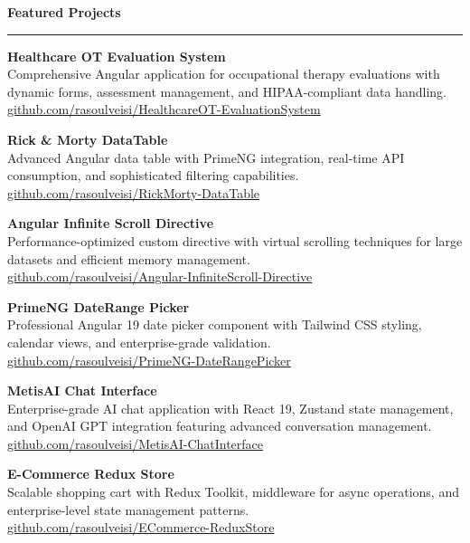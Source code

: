 \documentclass[a4paper,10pt]{article}
\newcommand{\sectionheader}[1]{\vspace{6pt}\textbf{\large\color{headercolor}#1}\vspace{1pt}\hrule\vspace{4pt}}
\newcommand{\projecttitle}[1]{\textbf{#1}}
\begin{document}
\sectionheader{Featured Projects}
\vspace{-2pt}
\begin{multicols}{2}

\projecttitle{Healthcare OT Evaluation System} \\
Comprehensive Angular application for occupational therapy evaluations with dynamic forms, assessment management, and HIPAA-compliant data handling. \\
\href{https://github.com/rasoulveisi/HealthcareOT-EvaluationSystem}{\footnotesize github.com/rasoulveisi/HealthcareOT-EvaluationSystem}

\vspace{4pt}
\projecttitle{Rick \& Morty DataTable} \\
Advanced Angular data table with PrimeNG integration, real-time API consumption, and sophisticated filtering capabilities. \\
\href{https://github.com/rasoulveisi/RickMorty-DataTable}{\footnotesize github.com/rasoulveisi/RickMorty-DataTable}

\vspace{4pt}
\projecttitle{Angular Infinite Scroll Directive} \\
Performance-optimized custom directive with virtual scrolling techniques for large datasets and efficient memory management. \\
\href{https://github.com/rasoulveisi/Angular-InfiniteScroll-Directive}{\footnotesize github.com/rasoulveisi/Angular-InfiniteScroll-Directive}

\columnbreak

\projecttitle{PrimeNG DateRange Picker} \\
Professional Angular 19 date picker component with Tailwind CSS styling, calendar views, and enterprise-grade validation. \\
\href{https://github.com/rasoulveisi/PrimeNG-DateRangePicker}{\footnotesize github.com/rasoulveisi/PrimeNG-DateRangePicker}

\vspace{4pt}
\projecttitle{MetisAI Chat Interface} \\
Enterprise-grade AI chat application with React 19, Zustand state management, and OpenAI GPT integration featuring advanced conversation management. \\
\href{https://github.com/rasoulveisi/MetisAI-ChatInterface}{\footnotesize github.com/rasoulveisi/MetisAI-ChatInterface}

\vspace{4pt}
\projecttitle{E-Commerce Redux Store} \\
Scalable shopping cart with Redux Toolkit, middleware for async operations, and enterprise-level state management patterns. \\
\href{https://github.com/rasoulveisi/ECommerce-ReduxStore}{\footnotesize github.com/rasoulveisi/ECommerce-ReduxStore}

\end{multicols}
\end{document}
